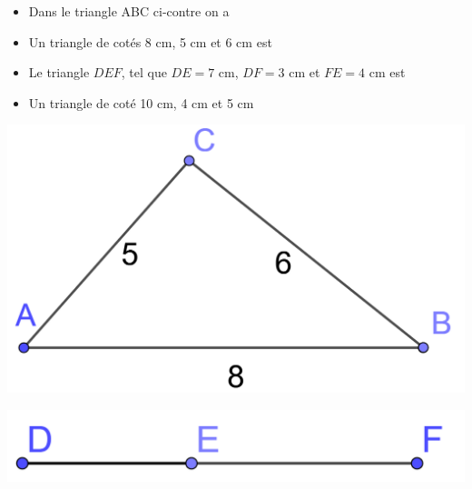 \documentclass[12pt,a4paper]{article}
\begin{document}
\begin{myexs}
	\begin{multicols}{2}
		\begin{itemize}
			\item Dans le triangle ABC ci-contre on a %
			\item Un triangle de cotés 8 cm, 5 cm et 6 cm est %
			
			\item Le triangle $DEF$, tel que $DE = 7$ cm, $DF = 3$ cm et $FE = 4$ cm est  %
			\vspace*{1cm}
			\item Un triangle de coté 10 cm, 4 cm et 5 cm %
		\end{itemize}
		
		
		\begin{center}
			\includegraphics[scale=0.25]{triangle1}
			
			\includegraphics[scale=0.2]{triangle2}
		\end{center}
	\end{multicols}
\end{myexs}
\end{document}
